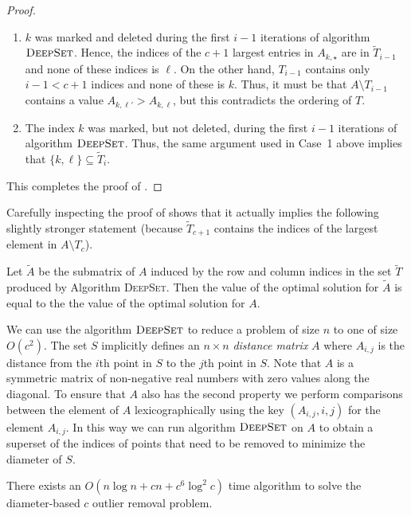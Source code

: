 \documentclass[lotsofwhite]{patmorin}
\begin{document}
\begin{proof}
\begin{enumerate}
\begin{enumerate}

\item $k$ was marked and deleted during the first $i-1$ iterations of
algorithm $\textsc{DeepSet}$. Hence, the indices of the $c+1$ largest
entries in $A_{k,\star}$ are in $\tilde{T}_{i-1}$ and none of these
indices is $\ell$.  On the other hand, $T_{i-1}$ contains only $i-1 <
c+1$ indices and none of these is $k$.  Thus, it must be that
$A\setminus T_{i-1}$ contains a value 
$A_{k,\ell'}>A_{k,\ell}$, but this contradicts the ordering of $T$.

\item The index $k$ was marked, but not deleted, during the first
$i-1$ iterations of algorithm $\textsc{DeepSet}$.  Thus, the same
argument used in Case~1 above implies that $\{k,\ell\}\subseteq
\tilde{T}_i$.

\end{enumerate}
\end{enumerate}
This completes the proof of .
\end{proof} 

Carefully inspecting the proof of  shows that it
actually implies the following slightly stronger statement (because
$\tilde{T}_{c+1}$ contains the indices of the largest element in
$A\setminus T_c$).

\begin{lem}
Let $\tilde{A}$ be the submatrix of $A$ induced by the row and column
indices in the set $\tilde{T}$ produced by Algorithm \textsc{DeepSet}.
Then the value of the optimal solution for $\tilde{A}$ is equal to the
the value of the optimal solution for $A$.
\end{lem}

We can use the algorithm $\textsc{DeepSet}$ to reduce a problem of
size $n$ to one of size $O(c^2)$.  The set $S$ implicitly defines an
$n\times n$ \emph{distance matrix} $A$ where $A_{i,j}$ is the distance
from the $i$th point in $S$ to the $j$th point in $S$.  Note that $A$
is a symmetric matrix of non-negative real numbers with zero values
along the diagonal.  To ensure that $A$ also has the second property
we perform comparisons between the element of $A$ lexicographically
using the key $(A_{i,j}, i, j)$ for the element $A_{i,j}$.  In this
way we can run algorithm $\textsc{DeepSet}$ on $A$ to obtain a
superset of the indices of points that need to be removed to minimize
the diameter of $S$.

\begin{lem}
There exists an $O(n\log n + cn + c^6\log^2 c)$ time algorithm to
solve the diameter-based $c$ outlier removal problem.
\end{lem}
\end{document}
